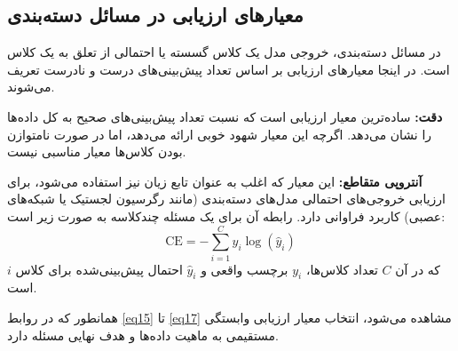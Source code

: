 \subsection{معیارهای ارزیابی در مسائل دسته‌بندی}\label{subsec:3-6-2}
در مسائل دسته‌بندی، خروجی مدل یک کلاس گسسته یا احتمالی از تعلق به یک کلاس است. در اینجا معیارهای ارزیابی بر اساس تعداد پیش‌بینی‌های درست و نادرست تعریف می‌شوند. 

\textbf{دقت:} ساده‌ترین معیار ارزیابی است که نسبت تعداد پیش‌بینی‌های صحیح به کل داده‌ها را نشان می‌دهد. اگرچه این معیار شهود خوبی ارائه می‌دهد، اما در صورت نامتوازن بودن کلاس‌ها معیار مناسبی نیست.

\textbf{آنتروپی متقاطع:} این معیار که اغلب به عنوان تابع زیان نیز استفاده می‌شود، برای ارزیابی خروجی‌های احتمالی مدل‌های دسته‌بندی (مانند رگرسیون لجستیک یا شبکه‌های عصبی) کاربرد فراوانی دارد. رابطه آن برای یک مسئله چندکلاسه به صورت زیر است:
\begin{equation} \label{eq17}
	\mathrm{CE} = - \sum_{i=1}^{C} y_i \log(\hat{y}_i)
\end{equation}
که در آن $C$ تعداد کلاس‌ها، $y_i$ برچسب واقعی و $\hat{y}_i$ احتمال پیش‌بینی‌شده برای کلاس $i$ است.

همانطور که در روابط \eqref{eq15} تا \eqref{eq17} مشاهده می‌شود، انتخاب معیار ارزیابی وابستگی مستقیمی به ماهیت داده‌ها و هدف نهایی مسئله دارد.




